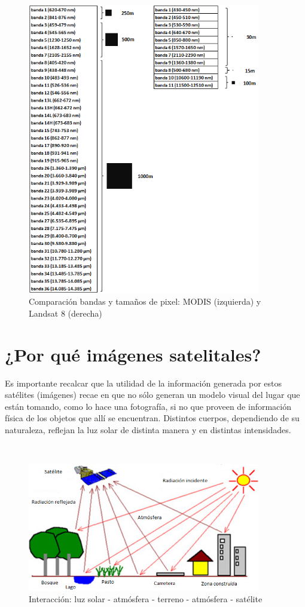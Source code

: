 \begin{figure}[h!]
\begin{center}
\leavevmode
\includegraphics[width=4in]{2_bandas_modis_landsat.png}
\end{center}
\caption{Comparación bandas y tamaños de pixel: MODIS (izquierda) y Landsat 8 (derecha)}
\end{figure}

\newpage

\section{¿Por qué imágenes satelitales?}

Es importante recalcar que la utilidad de la información generada por estos satélites (imágenes) recae en que no sólo generan un modelo visual del lugar que están tomando, como lo hace una fotografía, si no que proveen de información física de los objetos que allí se encuentran. Distintos cuerpos, dependiendo de su naturaleza, reflejan la luz solar de distinta manera y en distintas intensidades.

\\
\begin{figure}[h!]
\begin{center}
\leavevmode
\includegraphics[width=4in]{3_sol_satelites.png}
\end{center}
\caption{Interacción: luz solar - atmósfera - terreno - atmósfera - satélite}
\end{figure}
\\

